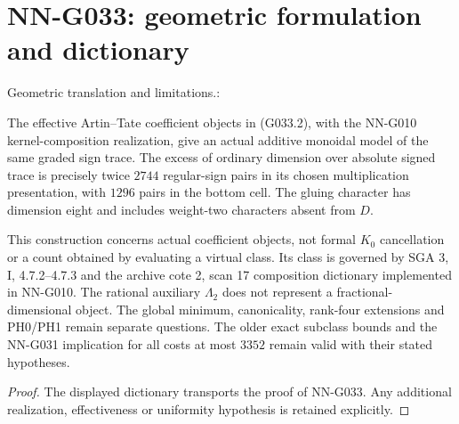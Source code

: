 \section{NN-G033: geometric formulation and dictionary}
\begin{geometricstatement}[NN-G033]
Geometric translation and limitations.:

The effective Artin--Tate coefficient objects in
(G033.2), with the NN-G010 kernel-composition realization,
give an actual additive monoidal model of the same
graded sign trace. The excess of ordinary dimension
over absolute signed trace is precisely twice $2744$
regular-sign pairs in its chosen multiplication
presentation, with $1296$ pairs in the bottom cell.
The gluing character has dimension eight and includes
weight-two characters absent from $D$.

This construction concerns actual coefficient objects,
not formal $K_0$ cancellation or a count obtained by
evaluating a virtual class. Its class is governed by
SGA 3, I, 4.7.2--4.7.3 and the archive cote 2, scan 17
composition dictionary implemented in NN-G010.
The rational auxiliary $\Lambda_2$ does not represent
a fractional-dimensional object. The global minimum,
canonicality, rank-four extensions and PH0/PH1 remain
separate questions. The older exact subclass bounds
and the NN-G031 implication for all costs at most
$3352$ remain valid with their stated hypotheses.



\end{geometricstatement}
\begin{proof} The displayed dictionary transports the proof of NN-G033. Any additional realization, effectiveness or uniformity hypothesis is retained explicitly.\end{proof}


